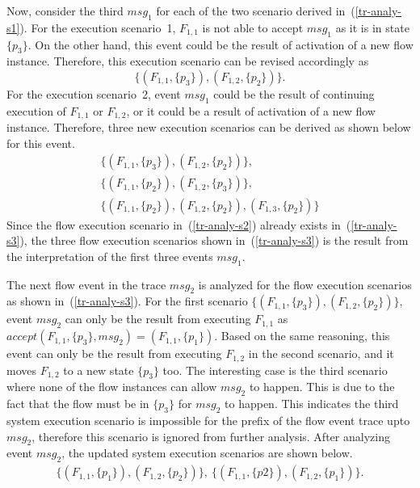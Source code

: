 \documentclass[12pt,frontmatter,copyright,thesis]{usfmanus}
\begin{document}
 Now, consider the third $\mathit{msg}_1$ for each of the two scenario derived in~(\ref{tr-analy-s1}).    For the execution scenario~1, $F_{1,1}$ is not able to accept $\mathit{msg}_1$ as it is in state $\{p_3\}$.  On the other hand, this event could be the result of activation of a new flow instance.  Therefore, this execution scenario can be revised accordingly as 
 \[
 \label{tr-analy-s2}\tag{2}
 \{(F_{1,1}, \{p_3\}),(F_{1,2},\{p_2\})\}.
 \]   
 For the execution scenario~2, event $\mathit{msg}_1$ could be the result of continuing execution of $F_{1,1}$ or $F_{1,2}$, or it could be a result of activation of a new flow instance.  Therefore,  three new execution scenarios can be derived as shown below for this event.
 \[
 \label{tr-analy-s3}\tag{3}
 \begin{array}{l}
 \{(F_{1,1}, \{p_3\}), (F_{1,2}, \{p_2\})\},\\
 \{(F_{1,1}, \{p_2\}), (F_{1,2}, \{p_3\})\}, \\
 \{(F_{1,1}, \{p_2\}), (F_{1,2}, \{p_2\}), (F_{1,3}, \{p_2\})\}
 \end{array}
 \]
 Since the flow execution scenario in~(\ref{tr-analy-s2}) already exists in~(\ref{tr-analy-s3}), the three flow execution scenarios shown in~(\ref{tr-analy-s3}) is the result from the interpretation of the first three events $\mathit{msg}_1$.

 The next flow event in the trace $\mathit{msg_2}$ is analyzed for the flow execution scenarios as shown in~(\ref{tr-analy-s3}).   For the first scenario $\{(F_{1,1}, \{p_3\}), (F_{1,2}, \{p_2\})\}$, event $\mathit{msg_2}$ can only be the result from executing $F_{1,1}$ as $\mathit{accept}(F_{1,1}, \{p_3\}, \mathit{msg_2}) = (F_{1,1}, \{p_1\})$.   Based on the same reasoning, this event can only be the result from executing $F_{1,2}$ in the second scenario, and it moves $F_{1,2}$ to a new state $\{p_3\}$ too.  The interesting case is the third scenario where none of the flow instances can allow $\mathit{msg_2}$ to happen.  This is due to the fact that the flow must be in $\{p_3\}$ for $\mathit{msg_2}$ to happen.  This indicates the third system execution scenario is impossible for the prefix of the flow event trace upto $\mathit{msg_2}$, therefore this scenario is ignored from further analysis.  After analyzing event $\mathit{msg_2}$, the updated system execution scenarios are shown below.
 \[
 \begin{array}{l}
 \{(F_{1,1}, \{p_1\}), (F_{1,2}, \{p_2\})\},\ \{(F_{1,1}, \{p2\}), (F_{1,2}, \{p_1\})\}.
 \end{array}
 \]
\end{document}
